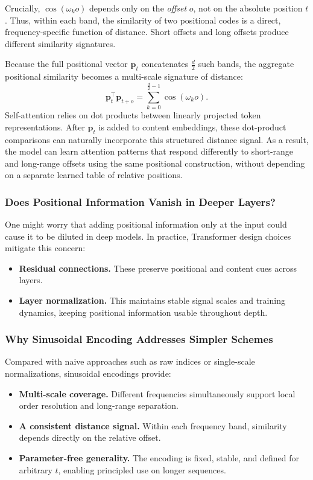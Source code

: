 \noindent
Crucially, \(\cos(\omega_k o)\) depends only on the \emph{offset} \(o\), not on the absolute position \(t\).
Thus, within each band, the similarity of two positional codes is a direct, frequency-specific function of distance.
Short offsets and long offsets produce different similarity signatures.

\noindent
Because the full positional vector \(\mathbf{p}_t\) concatenates \(\frac{d}{2}\) such bands,
the aggregate positional similarity becomes a multi-scale signature of distance:
\[
\mathbf{p}_t^\top \mathbf{p}_{t+o}
=
\sum_{k=0}^{\frac{d}{2}-1} \cos(\omega_k o).
\]
Self-attention relies on dot products between linearly projected token representations.
After \(\mathbf{p}_t\) is added to content embeddings,
these dot-product comparisons can naturally incorporate this structured distance signal.
As a result, the model can learn attention patterns that respond differently to short-range and long-range offsets
using the same positional construction,
without depending on a separate learned table of relative positions.

\subsubsection{Does Positional Information Vanish in Deeper Layers?}
\noindent
One might worry that adding positional information only at the input could cause it to be diluted in deep models.
In practice, Transformer design choices mitigate this concern:
\begin{itemize}
	\item \textbf{Residual connections.}
	These preserve positional and content cues across layers.
	\item \textbf{Layer normalization.}
	This maintains stable signal scales and training dynamics, keeping positional information usable throughout depth.
\end{itemize}

\subsubsection{Why Sinusoidal Encoding Addresses Simpler Schemes}
\noindent
Compared with naive approaches such as raw indices or single-scale normalizations, sinusoidal encodings provide:
\begin{itemize}
	\item \textbf{Multi-scale coverage.}
	Different frequencies simultaneously support local order resolution and long-range separation.
	\item \textbf{A consistent distance signal.}
	Within each frequency band, similarity depends directly on the relative offset.
	\item \textbf{Parameter-free generality.}
	The encoding is fixed, stable, and defined for arbitrary \(t\), enabling principled use on longer sequences.
\end{itemize}

